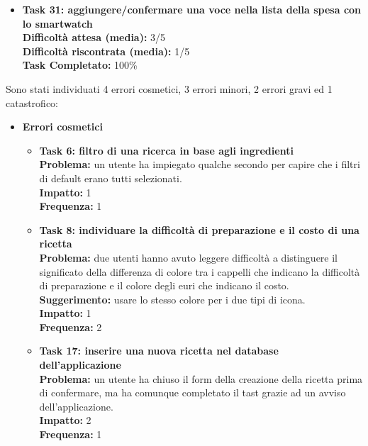\begin{itemize}
\item
\textbf{Task 31: aggiungere/confermare una voce nella lista della spesa con
lo smartwatch}\\
\textbf{Difficoltà attesa (media):} 3/5\\
\textbf{Difficoltà riscontrata (media):} 1/5\\
\textbf{Task Completato:} 100\%\\
\end{itemize}

Sono stati individuati 4 errori cosmetici, 3 errori minori, 2 errori
gravi ed 1 catastrofico:

\begin{itemize}
	\item \textbf{Errori cosmetici}
		\begin{itemize}
			\item \textbf{Task 6: filtro di una ricerca in base agli ingredienti}\\
				\textbf{Problema:} un utente ha impiegato qualche secondo per capire che i
				filtri di default erano tutti selezionati.\\
				\textbf{Impatto:} 1\\
				\textbf{Frequenza:} 1\\

			\item \textbf{Task 8: individuare la difficoltà di preparazione e il costo di una ricetta}\\
				\textbf{Problema:} due utenti hanno avuto leggere difficoltà a distinguere
				il significato della differenza di colore tra i cappelli che indicano la
				difficoltà di preparazione e il colore degli euri che indicano il
				costo.\\
				\textbf{Suggerimento:} usare lo stesso colore per i due tipi di icona.\\
				\textbf{Impatto:} 1\\
				\textbf{Frequenza:} 2\\

			\item \textbf{Task 17: inserire una nuova ricetta nel database
				dell'applicazione}\\
				\textbf{Problema:} un utente ha chiuso il form della creazione
				della ricetta prima di confermare, ma ha comunque completato il tast
				grazie ad un avviso dell'applicazione.\\
				\textbf{Impatto:} 2 \\
				\textbf{Frequenza:} 1\\
			

\end{itemize}
\end{itemize}
